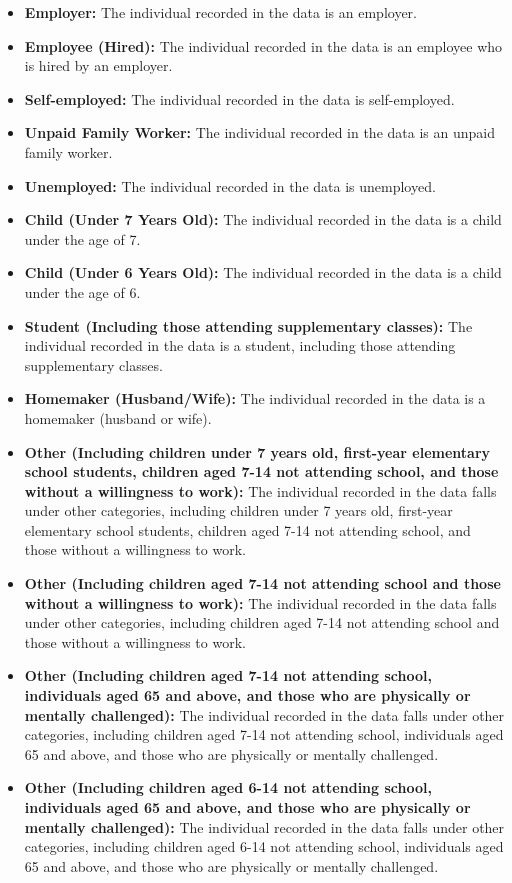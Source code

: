 \documentclass[twocolumn]{article}
\begin{document}
\begin{itemize}
    \item \textbf{Employer:} The individual recorded in the data is an employer.
    \item \textbf{Employee (Hired):} The individual recorded in the data is an employee who is hired by an employer.
    \item \textbf{Self-employed:} The individual recorded in the data is self-employed.
    \item \textbf{Unpaid Family Worker:} The individual recorded in the data is an unpaid family worker.
    \item \textbf{Unemployed:} The individual recorded in the data is unemployed.
    \item \textbf{Child (Under 7 Years Old):} The individual recorded in the data is a child under the age of 7.
    \item \textbf{Child (Under 6 Years Old):} The individual recorded in the data is a child under the age of 6.
    \item \textbf{Student (Including those attending supplementary classes):} The individual recorded in the data is a student, including those attending supplementary classes.
    \item \textbf{Homemaker (Husband/Wife):} The individual recorded in the data is a homemaker (husband or wife).
    \item \textbf{Other (Including children under 7 years old, first-year elementary school students, children aged 7-14 not attending school, and those without a willingness to work):} The individual recorded in the data falls under other categories, including children under 7 years old, first-year elementary school students, children aged 7-14 not attending school, and those without a willingness to work.
    \item \textbf{Other (Including children aged 7-14 not attending school and those without a willingness to work):} The individual recorded in the data falls under other categories, including children aged 7-14 not attending school and those without a willingness to work.
    \item \textbf{Other (Including children aged 7-14 not attending school, individuals aged 65 and above, and those who are physically or mentally challenged):} The individual recorded in the data falls under other categories, including children aged 7-14 not attending school, individuals aged 65 and above, and those who are physically or mentally challenged.
    \item \textbf{Other (Including children aged 6-14 not attending school, individuals aged 65 and above, and those who are physically or mentally challenged):} The individual recorded in the data falls under other categories, including children aged 6-14 not attending school, individuals aged 65 and above, and those who are physically or mentally challenged.
\end{itemize}
\end{document}
